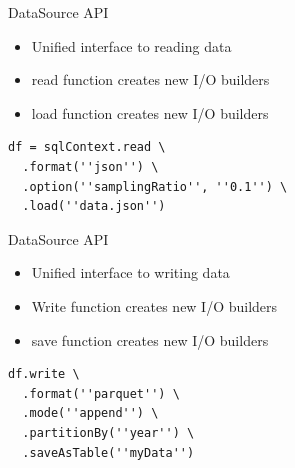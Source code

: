 

\begin{frame}[fragile=singleslide]{DataSource API}
\begin{itemize}
	\item Unified interface to reading data
	\item {\color{red}read} function creates new I/O builders
	\item {\color{green}load} function creates new I/O builders
\end{itemize}

\vspace{20pt}

\begin{verbatim}
df = sqlContext.read \
  .format(''json'') \
  .option(''samplingRatio'', ''0.1'') \
  .load(''data.json'')
\end{verbatim}

\end{frame}

\begin{frame}[fragile=singleslide]{DataSource API}
\begin{itemize}
	\item Unified interface to writing data
	\item {\color{red}Write} function creates new I/O builders
	\item {\color{green}save} function creates new I/O builders
\end{itemize}

\vspace{20pt}

\begin{verbatim}
df.write \
  .format(''parquet'') \
  .mode(''append'') \
  .partitionBy(''year'') \
  .saveAsTable(''myData'')
\end{verbatim}

\end{frame}

